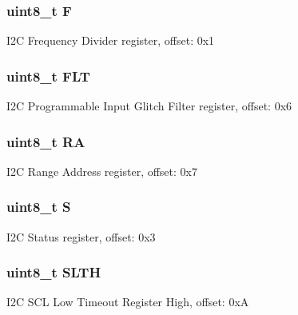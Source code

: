 \subsubsection[{F}]{\setlength{\rightskip}{0pt plus 5cm}uint8\+\_\+t F}\label{struct_i2_c___mem_map_a576f877ccc2837ffe5811406404acad1}
I2\+C Frequency Divider register, offset\+: 0x1 \hypertarget{struct_i2_c___mem_map_ae67b7939f64c519b55e6523baa5a2f22}{}
\subsubsection[{F\+L\+T}]{\setlength{\rightskip}{0pt plus 5cm}uint8\+\_\+t F\+L\+T}\label{struct_i2_c___mem_map_ae67b7939f64c519b55e6523baa5a2f22}
I2\+C Programmable Input Glitch Filter register, offset\+: 0x6 \hypertarget{struct_i2_c___mem_map_ae6b85b91f6d924aaa37833060797256e}{}
\subsubsection[{R\+A}]{\setlength{\rightskip}{0pt plus 5cm}uint8\+\_\+t R\+A}\label{struct_i2_c___mem_map_ae6b85b91f6d924aaa37833060797256e}
I2\+C Range Address register, offset\+: 0x7 \hypertarget{struct_i2_c___mem_map_aef44b210af6af7cb40efdfd5469406c0}{}
\subsubsection[{S}]{\setlength{\rightskip}{0pt plus 5cm}uint8\+\_\+t S}\label{struct_i2_c___mem_map_aef44b210af6af7cb40efdfd5469406c0}
I2\+C Status register, offset\+: 0x3 \hypertarget{struct_i2_c___mem_map_a09cb4115b7ad209d1f47362b420861d7}{}
\subsubsection[{S\+L\+T\+H}]{\setlength{\rightskip}{0pt plus 5cm}uint8\+\_\+t S\+L\+T\+H}\label{struct_i2_c___mem_map_a09cb4115b7ad209d1f47362b420861d7}
I2\+C S\+C\+L Low Timeout Register High, offset\+: 0x\+A \hypertarget{struct_i2_c___mem_map_afde3b60c25d0b8c0534a047e42c661f8}{}
